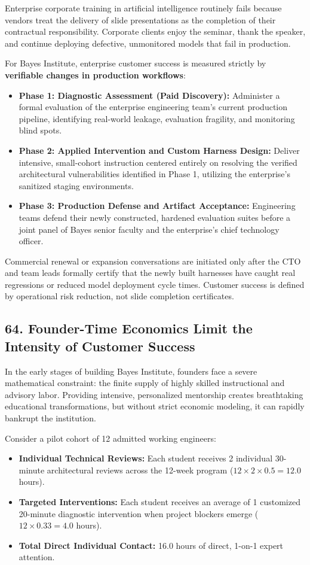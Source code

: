 Enterprise corporate training in artificial intelligence routinely fails because vendors treat the delivery of slide presentations as the completion of their contractual responsibility. Corporate clients enjoy the seminar, thank the speaker, and continue deploying defective, unmonitored models that fail in production.

For Bayes Institute, enterprise customer success is measured strictly by \textbf{verifiable changes in production workflows}:
\begin{itemize}[leftmargin=*]
\item \textbf{Phase 1: Diagnostic Assessment (Paid Discovery):} Administer a formal evaluation of the enterprise engineering team's current production pipeline, identifying real-world leakage, evaluation fragility, and monitoring blind spots.
\item \textbf{Phase 2: Applied Intervention and Custom Harness Design:} Deliver intensive, small-cohort instruction centered entirely on resolving the verified architectural vulnerabilities identified in Phase 1, utilizing the enterprise's sanitized staging environments.
\item \textbf{Phase 3: Production Defense and Artifact Acceptance:} Engineering teams defend their newly constructed, hardened evaluation suites before a joint panel of Bayes senior faculty and the enterprise's chief technology officer.
\end{itemize}

Commercial renewal or expansion conversations are initiated only after the CTO and team leads formally certify that the newly built harnesses have caught real regressions or reduced model deployment cycle times. Customer success is defined by operational risk reduction, not slide completion certificates.

\subsection*{64. Founder-Time Economics Limit the Intensity of Customer Success}

In the early stages of building Bayes Institute, founders face a severe mathematical constraint: the finite supply of highly skilled instructional and advisory labor. Providing intensive, personalized mentorship creates breathtaking educational transformations, but without strict economic modeling, it can rapidly bankrupt the institution.

Consider a pilot cohort of 12 admitted working engineers:
\begin{itemize}[leftmargin=*]
\item \textbf{Individual Technical Reviews:} Each student receives 2 individual 30-minute architectural reviews across the 12-week program ($12 \times 2 \times 0.5 = 12.0$ hours).
\item \textbf{Targeted Interventions:} Each student receives an average of 1 customized 20-minute diagnostic intervention when project blockers emerge ($12 \times 0.33 = 4.0$ hours).
\item \textbf{Total Direct Individual Contact:} 16.0 hours of direct, 1-on-1 expert attention.
\end{itemize}

